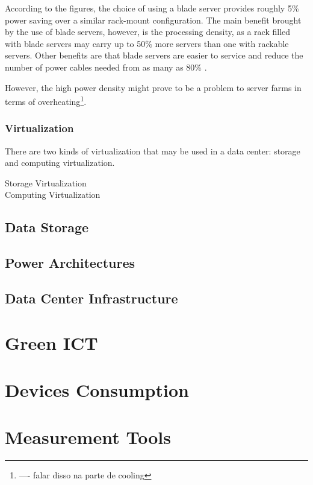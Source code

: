             According to the figures, the choice of using a blade server provides roughly 5\% power saving over a similar rack-mount configuration. The main benefit brought by the use of blade servers, however, is the processing density, as a rack filled with blade servers may carry up to 50\% more servers than one with rackable servers. Other benefits are that blade servers are easier to service and reduce the number of power cables needed from as many as 80\% \cite{Hendenson07}. 
            
            However, the high power density might prove to be a problem to server farms in terms of overheating\footnote{---- falar disso na parte de cooling}.
            
            \subsubsection*{Virtualization}
                There are two kinds of virtualization that may be used in a data center: storage and computing virtualization.
                \begin{description}
                    \item[Storage Virtualization] %
                    \item[Computing Virtualization] %
                \end{description}
                
                
        \subsection{Data Storage} \label{sec2:data_storage}
        
        
        \subsection{Power Architectures} \label{sec2:power_architectures}
        
        
        \subsection{Data Center Infrastructure} \label{sec2:data_center_infrastructure}
            


\section{Green ICT} \label{sec2:green_ict}
\section{Devices Consumption} \label{sec2:devices_consumption} 
\section{Measurement Tools} \label{sec2:tools}
